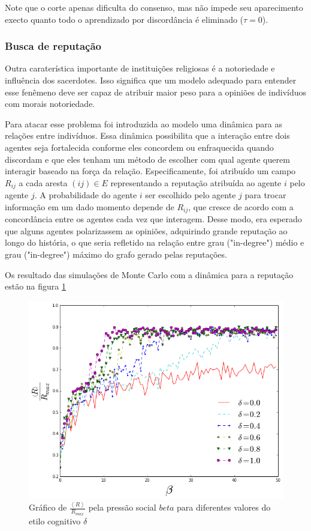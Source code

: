\documentclass[11pt]{article}
\begin{document}
Note que o corte apenas dificulta do consenso, mas não impede seu
aparecimento execto quanto todo o aprendizado por discordância é eliminado
($\tau=0$).

\subsubsection{Busca de reputação}

Outra caraterística importante de instituições religiosas é a notoriedade e
influência dos
sacerdotes. Isso significa que um modelo adequado para entender esse fenêmeno
deve ser capaz de atribuir maior peso para a opiniões de indivíduos com morais
notoriedade.

Para atacar esse problema foi introduzida ao modelo uma dinâmica para as
relações entre indivíduos. Essa dinâmica possibilita que a interação entre dois
agentes seja fortalecida conforme eles concordem ou enfraquecida quando
discordam e que eles tenham um método de escolher com qual agente querem
interagir baseado na força da relação. Especificamente, foi atribuído um campo
$R_{ij}$ a cada aresta $(ij) \in E$ representando a reputação atribuída ao
agente $i$ pelo agente $j$. A probabilidade do agente $i$ ser escolhido pelo
agente $j$ para trocar informação em um dado momento depende de $R_{ij}$, que
cresce de acordo com a concordância entre os agentes cada vez que interagem.
Desse modo, era esperado que alguns agentes polarizassem as opiniões, adquirindo
grande reputação ao longo do história, o que seria refletido na relação entre
grau ("in-degree") médio e grau ("in-degree") máximo do grafo gerado pelas 
reputações. 

Os resultado das simulações de Monte Carlo com a dinâmica para a
reputação estão na figura \ref{R-b-d}

\begin{figure}[h!]
  \centering
      \includegraphics[width=1.0\textwidth]{R-beta-delta.png}
  \caption{Gráfico de $\frac{\left<R\right>}{R_{max}}$ pela pressão social
  $beta$ para diferentes valores do etilo cognitivo $\delta$}
  \label{R-b-d}
\end{figure}
\end{document}

